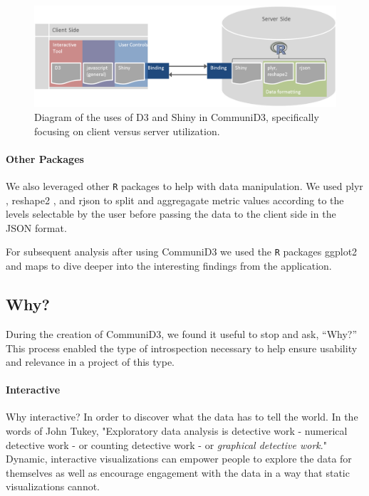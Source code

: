 \documentclass[11pt]{article}\usepackage{knitr}
\begin{document}
\begin{figure}[H]
\centering
\includegraphics[width=\textwidth]{images/D3shiny.png}
\caption{\label{fig:D3shiny} Diagram of the uses of D3 and Shiny in CommuniD3, specifically focusing on client versus server utilization.}
\end{figure}

\paragraph{Other Packages}
We also leveraged other {\tt R} packages to help with data manipulation. We used plyr \cite{plyr}, reshape2 \cite{reshape2}, and rjson \cite{rjson} to split and aggregagate metric values according to the levels selectable by the user before passing the data to the client side in the JSON format. 

For subsequent analysis after using CommuniD3 we used the {\tt R} packages ggplot2 \cite{ggplot2} and maps \cite{maps} to dive deeper into the interesting findings from the application.


\subsection{Why?}
During the creation of CommuniD3, we found it useful to stop and ask, ``Why?'' This process enabled the type of introspection necessary to help ensure usability and relevance in a project of this type.

\paragraph{Interactive}
Why interactive? In order to discover what the data has to tell the world. In the words of John Tukey, "Exploratory data analysis is detective work - numerical detective work - or counting detective work - or \emph{graphical detective work}." \cite{tukey77} Dynamic, interactive visualizations can empower people to explore the data for themselves as well as encourage engagement with the data in a way that static visualizations cannot.
\end{document}
